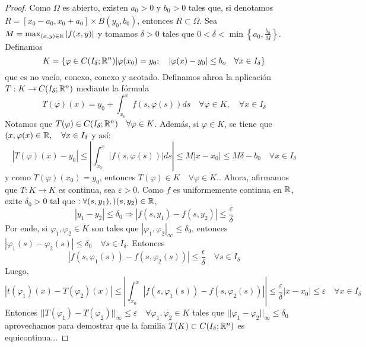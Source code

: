 \begin{proof}
	Como $\Omega$ es abierto, existen $a_0>0$ y $b_0>0$ tales que, si denotamos $R=[x_0-a_0,x_0+a_0]\times \overline{B(y_0,b_0)}$, entonces $R \subset \Omega$. Sea $M=\max_{(x,y)\in \mathbb{R}}|f(x,y)|$ y tomamos $\delta > 0$ tales que $0 < \delta < \min\left\{a_0, \frac{b_0}{M}\right\}$. Definamos 
	\[  K=\{\varphi \in C(I_{\delta};\mathbb{R}^n)| \varphi(x_0)=y_0;\quad |\varphi(x)-y_0|\leq b_o \quad \forall x \in I_{\delta}\}\]
	que es no vacío, conexo, conexo y acotado. Definamos ahroa la aplicación $T:K\rightarrow C(I_{\delta};\mathbb{R}^n)$ mediante la fórmula 
	\[ T(\varphi)(x)=y_0 + \int_{x_0}^{x} f(s,\varphi(s))ds \quad \forall \varphi \in K, \quad \forall x \in I_{\delta}\]
	Notamos que $T(\varphi)\in C(I_{\delta};\mathbb{R}^n) \quad \forall \varphi \in K$. Además, si $\varphi \in K$, se tiene que $(x,\varphi(x)\in \mathbb{R}, \quad \forall x \in I_{\delta}$ y así:
	\[ |T(\varphi)(x)-y_0|\leq \left| \int_{x_0}^{x}|f(s,\varphi(s))|ds \right| \leq M|x-x_0|\leq M\delta -b_0 \quad \forall x \in I_{\delta} \]
	y como $T(\varphi)(x_0)=y_0$, entonces $T(\varphi)\in K\quad \forall \varphi \in K.$. Ahora, afirmamos que $T:K\rightarrow K$ es continua, sea $\varepsilon >0$. Como $f$ es uniformemente continua en $\mathbb{R}$, exite $\delta_0 >0$ tal que $:\forall(s,y_1),)(s,y_2)\in \mathbb{R}$, 
	\[|y_1-y_2|\leq \delta_0 \Rightarrow |f(s,y_1)-f(s,y_2)|\leq \frac{\varepsilon}{\delta}\]
	Por ende, si $\varphi_1,\varphi_2 \in K$ son tales que $|\varphi_1,\varphi_2|_{\infty}\leq \delta_0$, entonces $|\varphi_1(s)-\varphi_2(s)|\leq \delta_0\quad \forall s \in I_{\delta}$. Entonces 
	\[ |f(s,\varphi_1(s))-f(s,\varphi_2(s))|\leq \frac{\epsilon}{\delta}\quad \forall s \in I_{\delta} \]
	Luego,
	\[|t(\varphi_1)(x)-T(\varphi_2)(x)|\leq \left|\int_{x_0}^{x}|f(s,\varphi_1(s))-f(s,\varphi_2(s))|\right| \leq \frac{\varepsilon}{\delta}|x-x_0|\leq \varepsilon \quad \forall x \in I_{\delta}\]
	Entonces $||T(\varphi_1)-T(\varphi_2)||_{\infty}\leq \varepsilon \quad \forall \varphi_1,\varphi_2\in K$ tales que $||\varphi_1 -\varphi_2||_{\infty} \leq \delta_0$ aprovechamos para demostrar que la familia $T(K)\subset C(I_{\delta};\mathbb{R}^n)$ es equicontinua...
\end{proof}
